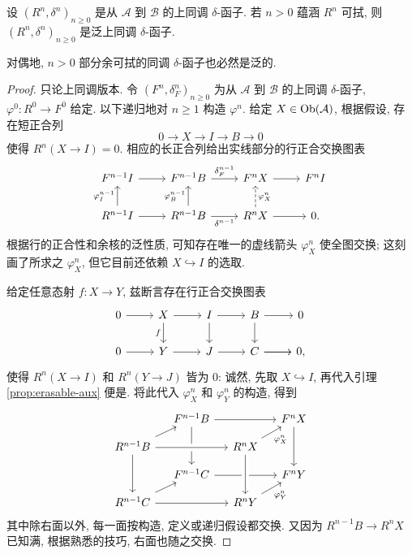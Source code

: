 \begin{proposition}\label{prop:erasable-univ-delta}
	设 $(R^n, \delta^n)_{n \geq 0}$ 是从 $\mathcal{A}$ 到 $\mathcal{B}$ 的上同调 $\delta$-函子. 若 $n > 0$ 蕴涵 $R^n$ 可拭, 则 $(R^n, \delta^n)_{n \geq 0}$ 是泛上同调 $\delta$-函子.
	
	对偶地, $n > 0$ 部分余可拭的同调 $\delta$-函子也必然是泛的.
\end{proposition}
\begin{proof}
	只论上同调版本. 令 $(F^n, \delta_F^n)_{n \geq 0}$ 为从 $\mathcal{A}$ 到 $\mathcal{B}$ 的上同调 $\delta$-函子, $\varphi^0: R^0 \to F^0$ 给定. 以下递归地对 $n \geq 1$ 构造 $\varphi^n$. 给定 $X \in \operatorname{Ob}(\mathcal{A})$, 根据假设, 存在短正合列
	\[ 0 \to X \to I \to B \to 0 \]
	使得 $R^n(X \to I) = 0$. 相应的长正合列给出实线部分的行正合交换图表
	\[\begin{tikzcd}
		F^{n-1} I \arrow[r] & F^{n-1} B \arrow[r, "{\delta_F^{n-1}}"] & F^n X \arrow[r] & F^n I \\
		R^{n-1} I \arrow[u, "{\varphi^{n-1}_I}"] \arrow[r] & R^{n-1} B \arrow[u, "{\varphi^{n-1}_B}"] \arrow[r, "{\delta^{n-1}}"'] & R^n X \arrow[dashed, u, "{\varphi^n_X}"'] \arrow[r] & 0 .
	\end{tikzcd}\]
	根据行的正合性和余核的泛性质, 可知存在唯一的虚线箭头 $\varphi^n_X$ 使全图交换; 这刻画了所求之 $\varphi^n_X$, 但它目前还依赖 $X \hookrightarrow I$ 的选取.
	
	给定任意态射 $f: X \to Y$, 兹断言存在行正合交换图表
	\begin{equation}\label{eqn:erasable-univ-delta}\begin{tikzcd}
		0 \arrow[r] & X \arrow[d, "f"'] \arrow[r] & I \arrow[r] \arrow[d] & B \arrow[d] \arrow[r] & 0 \\
		0 \arrow[r] & Y \arrow[r] & J \arrow[r] & \arrow[r] C \arrow[r] & 0 ,
	\end{tikzcd}\end{equation}
	使得 $R^n(X \to I)$ 和 $R^n(Y \to J)$ 皆为 $0$: 诚然, 先取 $X \hookrightarrow I$, 再代入引理 \ref{prop:erasable-aux} 便是. 将此代入 $\varphi^n_X$ 和 $\varphi^n_Y$ 的构造, 得到
	\[\begin{tikzcd}[row sep=small, column sep=small]
		& F^{n-1} B \arrow[rr] \arrow[dd] & & F^n X \arrow[dd] \\
		R^{n-1} B \arrow[ru] \arrow[rr, crossing over] \arrow[dd] & & R^n X \arrow[ru, "{\varphi_X^n}"'] & \\
		& F^{n-1} C \arrow[rr] & & F^n Y \\
		R^{n-1} C \arrow[ru] \arrow[rr] & & R^n Y \arrow[ru, "{\varphi_Y^n}"'] \arrow[leftarrow, uu, crossing over] &
	\end{tikzcd}\]
	其中除右面以外, 每一面按构造, 定义或递归假设都交换. 又因为 $R^{n-1} B \to R^n X$ 已知满, 根据熟悉的技巧, 右面也随之交换.
	

\end{proof}
